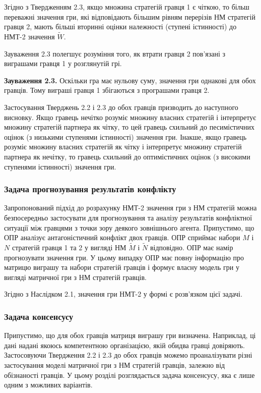 \documentclass[14pt, a4paper, oneside]{extarticle}
\numberwithin{equation}{section}
\begin{document}
Згідно з Твердженням 2.3, якщо множина стратегій гравця 1 є чіткою, то більш переважні значення гри, які відповідають більшим рівням перерізів НМ стратегій гравця 2, мають більші вторинні оцінки належності (ступені істинності) до НМТ-2 значення $\tilde{W}$.

Зауваження 2.3 полегшує розуміння того, як втрати гравця 2 пов'язані з виграшами гравця 1 у розглянутій грі.

\textbf{Зауваження 2.3.} Оскільки гра має нульову суму, значення гри однакові для обох гравців. Тому виграші гравця 1 збігаються з програшами гравця 2.

Застосування Тверджень 2.2 і 2.3 до обох гравців призводить до наступного висновку. Якщо гравець нечітко розуміє множину власних стратегій і інтерпретує множину стратегій партнера як чітку, то цей гравець схильний до песимістичних оцінок (з низькими ступенями істинності) значення гри. Інакше, якщо гравець розуміє множину власних стратегій як чітку і інтерпретує множину стратегій партнера як нечітку, то гравець схильний до оптимістичних оцінок (з високими ступенями істинності) значення гри.

\subsubsection{Задача прогнозування результатів конфлікту}
 Запропонований підхід до розрахунку НМТ-2 значення гри з НМ стратегій можна безпосередньо застосувати для прогнозування та аналізу результатів конфліктної ситуації між гравцями з точки зору деякого зовнішнього агента. Припустимо, що ОПР аналізує антагоністичний конфлікт двох гравців. ОПР сприймає набори $M$ і $N$ стратегій гравця 1 та 2 у вигляді НМ $\tilde{M}$ і $\tilde{N}$ відповідно. ОПР має намір прогнозувати значення гри. У цьому випадку ОПР має повну інформацію про матрицю виграшу та набори стратегій гравців і формує власну модель гри у вигляді матричної гри з НМ стратегій гравців.

Згідно з Наслідком 2.1, значення гри НМТ-2 у формі є розв'язком цієї задачі.

\subsubsection{Задача консенсусу}
Припустимо, що для обох гравців матриця виграшу гри визначена. Наприклад, ці дані надані якоюсь компетентною організацією, якій обидва гравці довіряють. Застосовуючи Твердження 2.2 і 2.3 до обох гравців можемо проаналізувати різні застосування моделі матричної гри з НМ стратегій гравців, залежно від обізнаності гравців. У цьому розділі розглядається задача консенсусу, яка є лише одним з можливих варіантів.
\end{document}
